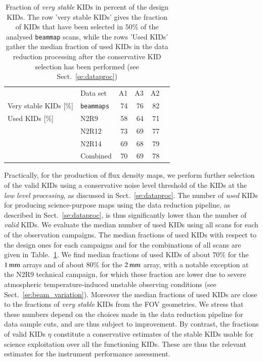 \documentclass[traditionalabstract]{aa}
\newcommand{\lp}[1]{#1}
\begin{document}
\begin{table}[!htbp]
  \centering
  \caption[]{Fraction of \emph{very stable} KIDs in percent of the design
  KIDs. The row 'very stable KIDs' gives the fraction of KIDs that have been selected
  in {\lp $50\%$} of the analysed {\tt beammap} scans, while the rows 'Used KIDs' gather
  the median fraction of used KIDs in the data reduction processing
  after the conservative KID selection has been performed (see Sect.~\ref{se:dataproc})}
  \label{tab:eta_used}
  \begin{tabular}{llrrrr}
    \hline\hline
    \noalign{\smallskip}
    &  Data set   & A1      &   A3    &     A2 \\
    \noalign{\smallskip}
    \hline
    \noalign{\smallskip}
    Very stable KIDs [\%] & {\tt beammaps} & 74  &  76  &  82  \\
    \hline
    \noalign{\smallskip}
    Used KIDs [\%]  & N2R9     & 58 &  64  & 71 \\
               & N2R12    & 73 &  69  & 77 \\
               & N2R14    & 69 &  68  & 79 \\
               & Combined & 70 &  69  & 78 \\
    \hline
  \end{tabular}
\end{table}

Practically, for the production of flux density maps, we perform
further selection of the valid KIDs using a conservative noise level
threshold of the KIDs at the \emph{low level processing}, as discussed in
Sect.~\ref{se:dataproc}. The number of \emph{used} KIDs for producing
science-purpose maps using the data reduction pipeline, as described
in Sect.~\ref{se:dataproc}, is thus significantly lower than the number of
\emph{valid} KIDs. We evaluate the median number of used KIDs using all scans
for each of the observation campaigns. The median fractions of used
KIDs with respect to the design ones for each campaigns and for the
combinations of all scans are given in Table.~\ref{tab:eta_used}. We
find median fractions of used KIDs of about $70\%$ for the
$1\, \rm{mm}$ arrays and of about $80\%$ for the $2\, \rm{mm}$ array,
with a notable exception at the N2R9 technical campaign, for which
these fraction are lower due to severe {\lp atmospheric} temperature-induced
unstable observing conditions (see
Sect.~\ref{se:beam_variation}). Moreover the median fractions of used
KIDs are close to the fractions of
\emph{very stable} KIDs from the FOV geometries. We stress that these numbers
depend on the choices made in the data reduction pipeline for data
sample cuts, and are thus subject to improvement. By contrast, the
fractions of valid KIDs $\eta$ constitute a conservative estimates of the
stable KIDs usable for science exploitation over all the functioning
KIDs. These are thus the relevant estimates for the instrument
performance assessment.  
 
\end{document}
